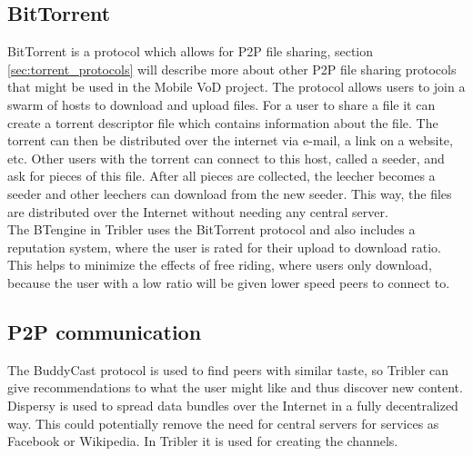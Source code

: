 \subsection{BitTorrent}
BitTorrent is a protocol which allows for P2P file sharing, section \ref{sec:torrent_protocols} will describe more about other P2P file sharing protocols that might be used in the Mobile VoD project. The protocol allows users to join a swarm of hosts to download and upload files. For a user to share a file it can create a torrent descriptor file which contains information about the file. The torrent can then be distributed over the internet via e-mail, a link on a website, etc. Other users with the torrent can connect to this host, called a seeder, and ask for pieces of this file. After all pieces are collected, the leecher becomes a seeder and other leechers can download from the new seeder. This way, the files are distributed over the Internet without needing any central server.\\ 
The BTengine in Tribler uses the BitTorrent protocol and also includes a reputation system, where the user is rated for their upload to download ratio. This helps to minimize the effects of free riding, where users only download, because the user with a low ratio will be given lower speed peers to connect to.

\subsection{P2P communication}
The BuddyCast protocol is used to find peers with similar taste, so Tribler can give recommendations to what the user might like and thus discover new content. Dispersy is used to spread data bundles over the Internet in a fully decentralized way. This could potentially remove the need for central servers for services as Facebook or Wikipedia. In Tribler it is used for creating the channels.